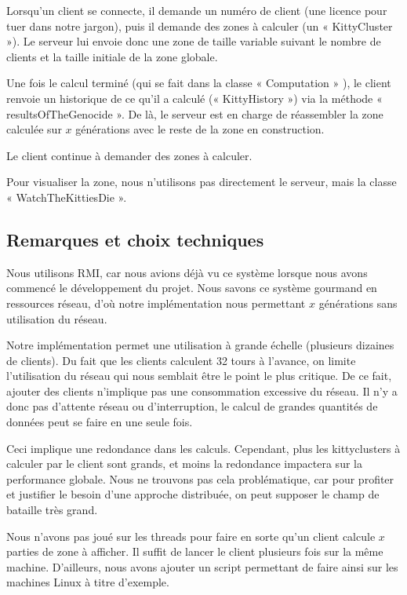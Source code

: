 \documentclass[twoside]{article}
\begin{document}
Lorsqu'un client se connecte, il demande un numéro de client (une licence pour tuer dans notre jargon), puis il demande des zones à calculer (un « KittyCluster »).
Le serveur lui envoie donc une zone de taille variable suivant le nombre de clients et la taille initiale de la zone globale.

Une fois le calcul terminé (qui se fait dans la classe « Computation » ), le client renvoie un historique de ce qu'il a calculé (« KittyHistory ») via la méthode « resultsOfTheGenocide ».
De là, le serveur est en charge de réassembler la zone calculée sur $x$ générations avec le reste de la zone en construction.

Le client continue à demander des zones à calculer.

Pour visualiser la zone, nous n'utilisons pas directement le serveur, mais la classe « WatchTheKittiesDie ».

\subsection{Remarques et choix techniques}
Nous utilisons RMI, car nous avions déjà vu ce système lorsque nous avons commencé le développement du projet.
Nous savons ce système gourmand en ressources réseau, d'où notre implémentation nous permettant $x$ générations sans utilisation du réseau.

Notre implémentation permet une utilisation à grande échelle (plusieurs dizaines de clients).
Du fait que les clients calculent 32 tours à l'avance, on limite l'utilisation du réseau qui nous semblait être le point le plus critique.
De ce fait, ajouter des clients n'implique pas une consommation excessive du réseau.
Il n'y a donc pas d'attente réseau ou d'interruption, le calcul de grandes quantités de données peut se faire en une seule fois.

Ceci implique une redondance dans les calculs.
Cependant, plus les kittyclusters à calculer par le client sont grands, et moins la redondance impactera sur la performance globale.
Nous ne trouvons pas cela problématique, car pour profiter et justifier le besoin d'une approche distribuée, on peut supposer le champ de bataille très grand.

Nous n'avons pas joué sur les threads pour faire en sorte qu'un client calcule $x$ parties de zone à afficher.
Il suffit de lancer le client plusieurs fois sur la même machine.
D'ailleurs, nous avons ajouter un script permettant de faire ainsi sur les machines Linux à titre d'exemple.
\end{document}
